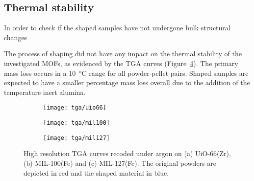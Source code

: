 
\subsection{Thermal stability}

In order to check if the shaped samples have not undergone bulk
structural changes

The process of shaping did not have any impact on the thermal stability of 
the investigated MOFs, as evidenced by the TGA curves 
(Figure~\ref{fig:shaping:tgacurves}). The primary mass loss occurs 
in a \SI{10}{\degreeCelsius} range for all powder-pellet pairs.
Shaped samples are expected to have a smaller percentage mass loss 
overall due to the addition of the temperature inert alumina.

\begin{figure}
    \centering
    
    \begin{subfigure}{0.6\textwidth}
        \parbox[c]{0.1\linewidth}{\caption{}\label{fig:shaping:tgauio66}}%
        \parbox[b]{0.7\linewidth}{%
        \texttt{[image: tga/uio66]}%
        }%
    \end{subfigure}

    \begin{subfigure}{0.6\textwidth}
        \parbox[c]{0.1\linewidth}{\caption{}\label{fig:shaping:tgamil100}}%
        \parbox[b]{0.7\linewidth}{%
        \texttt{[image: tga/mil100]}%
        }%
    \end{subfigure}

    \begin{subfigure}{0.6\textwidth}
        \parbox[c]{0.1\linewidth}{\caption{}\label{fig:shaping:tgamil127}}%
        \parbox[b]{0.7\linewidth}{%
        \texttt{[image: tga/mil127]}%
        }%
    \end{subfigure}
    
    \caption{High resolution TGA curves recoded under argon 
    on (a) UiO-66(Zr), (b) MIL-100(Fe) and (c) MIL-127(Fe). The 
    original powders are depicted in red and the shaped material
    in blue.}%
    \label{fig:shaping:tgacurves}

\end{figure}
